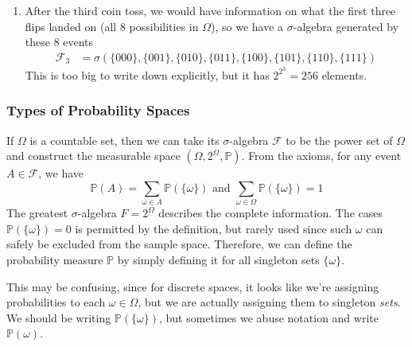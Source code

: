\begin{example}
\begin{enumerate}
        \item After the third coin toss, we would have information on what the first three flips landed on (all 8 possibilities in $\Omega$), so we have a $\sigma$-algebra generated by these 8 events 
        \begin{align}
          \mathcal{F}_3 & = \sigma(\{000\}, \{001\}, \{010\}, \{011\}, \{100\}, \{101\}, \{110\}, \{111\})
        \end{align}
        This is too big to write down explicitly, but it has $2^{2^3} = 256$ elements. 
      \end{enumerate}
    \end{example}

  \subsubsection{Types of Probability Spaces}

    \begin{definition}
      If $\Omega$ is a countable set, then we can take its $\sigma$-algebra $\mathcal{F}$ to be the power set of $\Omega$ and construct the measurable space $(\Omega, 2^\Omega, \mathbb{P})$. From the axioms, for any event $A \in \mathcal{F}$, we have
      \begin{equation}
        \mathbb{P} (A) = \sum_{\omega \in A} \mathbb{P}(\{\omega\}) \text{ and } \sum_{\omega \in \Omega} \mathbb{P}(\{\omega\}) = 1
      \end{equation}
      The greatest $\sigma$-algebra $F = 2^{\Omega}$ describes the complete information. The cases $\mathbb{P}(\{\omega\}) = 0$ is permitted by the definition, but rarely used since such $\omega$ can safely be excluded from the sample space. Therefore, we can define the probability measure $\mathbb{P}$ by simply defining it for all singleton sets $\{\omega\}$. 
    \end{definition}

    This may be confusing, since for discrete spaces, it looks like we're assigning probabilities to each $\omega \in \Omega$, but we are actually assigning them to singleton \textit{sets}. We should be writing $\mathbb{P}(\{\omega\})$, but sometimes we abuse notation and write $\mathbb{P}(\omega)$. 

